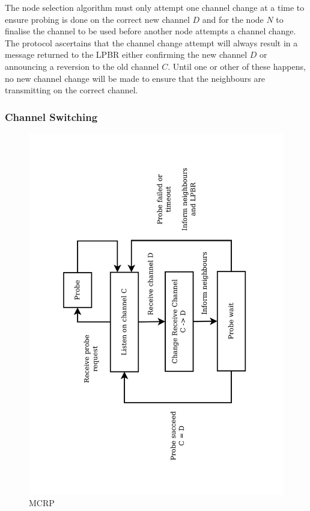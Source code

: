 The node selection algorithm must only attempt one channel change at a time to ensure probing is done on the correct new channel $D$ and for the node $N$ to finalise the channel to be used before another node attempts a channel change.
The protocol ascertains that the channel change attempt will always result in a message returned to the LPBR either confirming the new channel $D$ or announcing a reversion to the old channel $C$. Until one or other of these happens, no new channel change will be made to ensure that the neighbours are transmitting on the correct channel.

\subsubsection{Channel Switching}

\begin{figure}
\centering
\includegraphics[trim=2cm 2cm 2cm 2cm, clip=true, totalheight=0.36\textheight, angle=270]{figures/channelSwitching.pdf}
\caption{MCRP}
\label{fig_mcrpDiagram}
\end{figure}

